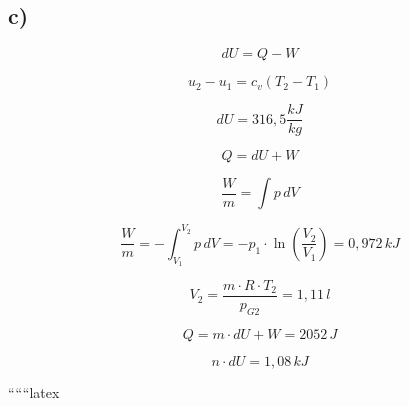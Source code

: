 

\subsection*{c)}

\[
dU = Q - W
\]

\[
u_2 - u_1 = c_v (T_2 - T_1)
\]

\[
dU = 316,5 \frac{kJ}{kg}
\]

\[
Q = dU + W
\]

\[
\frac{W}{m} = \int p \, dV
\]

\[
\frac{W}{m} = - \int_{V_1}^{V_2} p \, dV = -p_1 \cdot \ln \left(\frac{V_2}{V_1}\right) = 0,972 \, kJ
\]

\[
V_2 = \frac{m \cdot R \cdot T_2}{p_{G2}} = 1,11 \, l
\]

\[
Q = m \cdot dU + W = 2052 \, J
\]

\[
n \cdot dU = 1,08 \, kJ
\]

``````latex